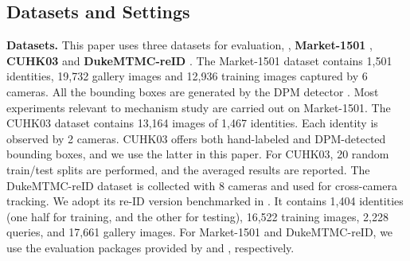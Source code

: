 \documentclass[10pt,twocolumn,letterpaper]{article}
\begin{document}
\subsection{Datasets and Settings}
\textbf{Datasets.} 
This paper uses three datasets for evaluation, \ie,  \textbf{Market-1501} \cite{DBLP:conf/iccv/ZhengSTWWT15}, \textbf{CUHK03} \cite{DBLP:conf/cvpr/LiZXW14} and \textbf{DukeMTMC-reID} \cite{ristani2016MTMC,zheng2017unlabeled}. The Market-1501 dataset contains 1,501 identities, 19,732 gallery images and 12,936 training images captured by 6 cameras. All the bounding boxes are generated by the DPM detector \cite{felzenszwalb2008discriminatively}. Most experiments relevant to mechanism study are carried out on Market-1501. The CUHK03 dataset contains 13,164 images of 1,467 identities. Each identity is observed by 2 cameras. CUHK03 offers both hand-labeled and DPM-detected bounding boxes, and we use the latter in this paper. For CUHK03, 20 random train/test splits are performed, and the averaged results are reported. The DukeMTMC-reID dataset is collected with 8 cameras and used for cross-camera tracking. We adopt its re-ID version benchmarked in \cite{zheng2017unlabeled}. It contains 1,404 identities (one half for training, and the other for testing), 16,522 training images, 2,228 queries, and 17,661 gallery images. For Market-1501 and DukeMTMC-reID, we use the evaluation packages provided by \cite{DBLP:conf/iccv/ZhengSTWWT15} and \cite{zheng2017unlabeled}, respectively.
\end{document}

